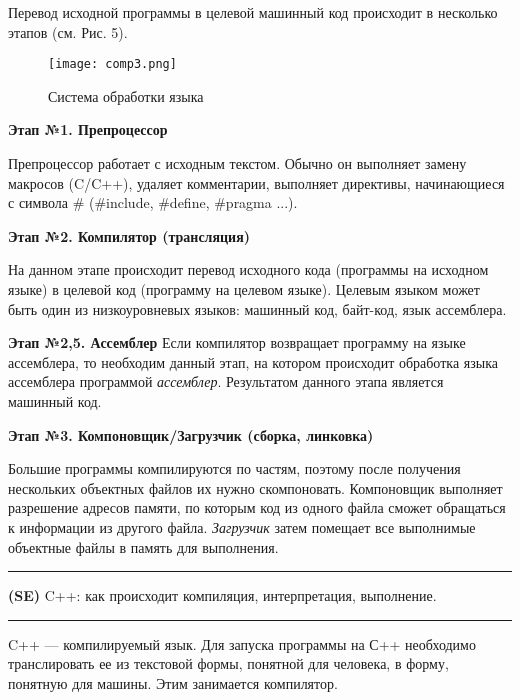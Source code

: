 \documentclass[12pt]{article}
\begin{document}
Перевод исходной программы в целевой машинный код происходит в несколько этапов (см. Рис. 5). \\

\begin{figure}
\centering
\texttt{[image: comp3.png]}
\caption{Система обработки языка}
\label{fig:mpr}
\end{figure} 


\textbf{Этап №1. Препроцессор}

Препроцессор работает с исходным текстом. Обычно он выполняет замену макросов (C/C++), удаляет комментарии, выполняет директивы, начинающиеся с символа \# (\#include, \#define, \#pragma ...).

\textbf{Этап №2. Компилятор (трансляция)}

На данном этапе происходит перевод исходного кода (программы на исходном языке) в целевой код (программу на целевом языке). Целевым языком может быть один из низкоуровневых языков: машинный код, байт-код, язык ассемблера.

\textbf{Этап №2,5. Ассемблер}
Если компилятор возвращает программу на языке ассемблера, то необходим данный этап, на котором происходит обработка языка ассемблера программой \textit{ассемблер}. Результатом данного этапа является машинный код.


\textbf{Этап №3. Компоновщик/Загрузчик (сборка, линковка)}

Большие программы компилируются по частям, поэтому после получения нескольких объектных файлов их нужно скомпоновать. Компоновщик выполняет разрешение адресов памяти, по которым код из одного файла сможет обращаться к информации из другого файла. \textit{Загрузчик} затем помещает все выполнимые объектные файлы в память для выполнения.























\newpage
\noindent\rule{\textwidth}{1pt}
\textbf{(SE)} C++: как происходит компиляция, интерпретация, выполнение.

\noindent\rule{\textwidth}{1pt}	

C++ --- компилируемый язык. Для запуска программы на С++ необходимо транслировать ее из текстовой формы, понятной для человека, в форму, понятную для машины. Этим занимается компилятор. 	
\end{document}

